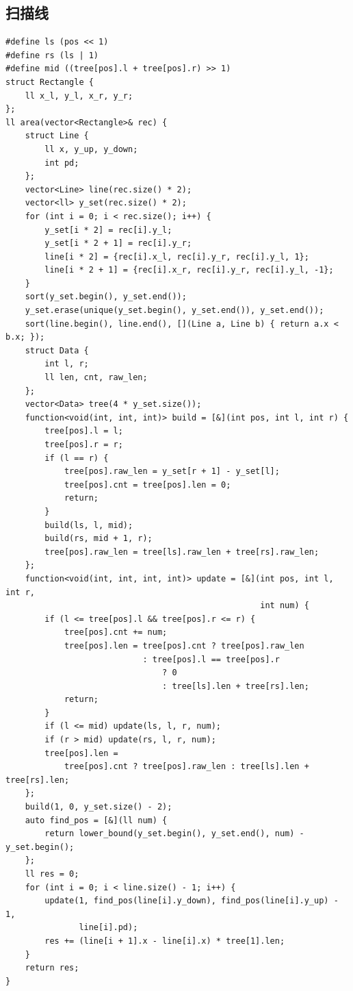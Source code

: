 \documentclass[UTF8]{ctexart}
\begin{document}
\begin{sloppypar}
\subsection{扫描线}

\begin{lstlisting}[style=cpp]
#define ls (pos << 1)
#define rs (ls | 1)
#define mid ((tree[pos].l + tree[pos].r) >> 1)
struct Rectangle {
    ll x_l, y_l, x_r, y_r;
};
ll area(vector<Rectangle>& rec) {
    struct Line {
        ll x, y_up, y_down;
        int pd;
    };
    vector<Line> line(rec.size() * 2);
    vector<ll> y_set(rec.size() * 2);
    for (int i = 0; i < rec.size(); i++) {
        y_set[i * 2] = rec[i].y_l;
        y_set[i * 2 + 1] = rec[i].y_r;
        line[i * 2] = {rec[i].x_l, rec[i].y_r, rec[i].y_l, 1};
        line[i * 2 + 1] = {rec[i].x_r, rec[i].y_r, rec[i].y_l, -1};
    }
    sort(y_set.begin(), y_set.end());
    y_set.erase(unique(y_set.begin(), y_set.end()), y_set.end());
    sort(line.begin(), line.end(), [](Line a, Line b) { return a.x < b.x; });
    struct Data {
        int l, r;
        ll len, cnt, raw_len;
    };
    vector<Data> tree(4 * y_set.size());
    function<void(int, int, int)> build = [&](int pos, int l, int r) {
        tree[pos].l = l;
        tree[pos].r = r;
        if (l == r) {
            tree[pos].raw_len = y_set[r + 1] - y_set[l];
            tree[pos].cnt = tree[pos].len = 0;
            return;
        }
        build(ls, l, mid);
        build(rs, mid + 1, r);
        tree[pos].raw_len = tree[ls].raw_len + tree[rs].raw_len;
    };
    function<void(int, int, int, int)> update = [&](int pos, int l, int r,
                                                    int num) {
        if (l <= tree[pos].l && tree[pos].r <= r) {
            tree[pos].cnt += num;
            tree[pos].len = tree[pos].cnt ? tree[pos].raw_len
                            : tree[pos].l == tree[pos].r
                                ? 0
                                : tree[ls].len + tree[rs].len;
            return;
        }
        if (l <= mid) update(ls, l, r, num);
        if (r > mid) update(rs, l, r, num);
        tree[pos].len =
            tree[pos].cnt ? tree[pos].raw_len : tree[ls].len + tree[rs].len;
    };
    build(1, 0, y_set.size() - 2);
    auto find_pos = [&](ll num) {
        return lower_bound(y_set.begin(), y_set.end(), num) - y_set.begin();
    };
    ll res = 0;
    for (int i = 0; i < line.size() - 1; i++) {
        update(1, find_pos(line[i].y_down), find_pos(line[i].y_up) - 1,
               line[i].pd);
        res += (line[i + 1].x - line[i].x) * tree[1].len;
    }
    return res;
}
\end{lstlisting}


\end{sloppypar}
\end{document}
